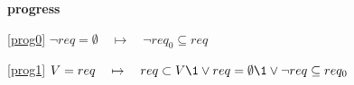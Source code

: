 \textbf{progress}
\begin{block}
\item[ \eqref{prog0} ]{$\neg req = \emptyset \quad \mapsto\quad \neg req_0 \subseteq req$} %
\item[ \eqref{prog1} ]{$V = req \quad \mapsto\quad req \subset V  %
      \1\lor req = \emptyset \1\lor \neg req \subseteq req_0$} %
\end{block}
